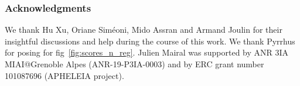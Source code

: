 \documentclass{article} %
\begin{document}
\subsubsection*{Acknowledgments}
We thank Hu Xu, Oriane Siméoni, Mido Assran and Armand Joulin for their insightful discussions and help during the course of this work.
We thank Pyrrhus for posing for fig~\ref{fig:scores_n_reg}.
Julien Mairal was supported by ANR 3IA MIAI@Grenoble Alpes (ANR-19-P3IA-0003) and by ERC grant number 101087696 (APHELEIA project).




\newpage
\appendix


\end{document}
